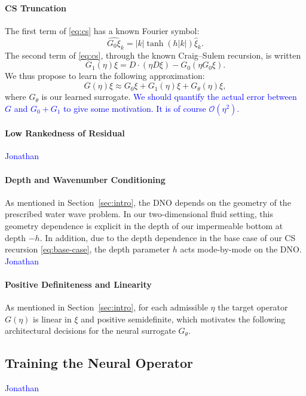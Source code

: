 \documentclass{article}
\begin{document}
\paragraph{CS Truncation}
The first term of \eqref{eq:cs} has a known Fourier symbol:
\begin{equation}
    \widehat{G_0\xi}_k=|k|\tanh(h|k|)\widehat\xi_k.
    \label{eq:base-case}
\end{equation}
The second term of \eqref{eq:cs}, through the known Craig--Sulem recursion,
is written
\begin{equation}
    G_1(\eta)\xi=D\cdot(\eta D\xi)-G_0(\eta G_0\xi).
\end{equation}
We thus propose to learn the following approximation:
\begin{equation}
    G(\eta)\xi\approx G_0\xi+G_1(\eta)\xi+G_\theta(\eta)\xi,
\end{equation}
where $G_\theta$ is our learned surrogate.
\textcolor{blue}{We should quantify the actual error between $G$ and
$G_0+G_1$ to give some motivation. It is of course $\mathcal O(\eta^2)$.}

\paragraph{Low Rankedness of Residual}
\textcolor{blue}{Jonathan}

\paragraph{Depth and Wavenumber Conditioning}
As mentioned in Section~\ref{sec:intro}, the DNO depends on the geometry of
the prescribed water wave problem. In our two-dimensional fluid setting,
this geometry dependence is explicit in the depth of our impermeable bottom
at depth $-h$. In addition, due to the depth dependence in the base case of
our CS recursion \eqref{eq:base-case}, the depth parameter $h$ acts
mode-by-mode on the DNO. \textcolor{blue}{Jonathan}

\paragraph{Positive Definiteness and Linearity}
As mentioned in Section~\ref{sec:intro}, for each admissible $\eta$ the target
operator $G(\eta)$ is linear in $\xi$ and positive semidefinite, which
motivates the following architectural decisions for the neural surrogate
$G_\theta$.

\subsection{Training the Neural Operator}
\textcolor{blue}{Jonathan}
\end{document}
